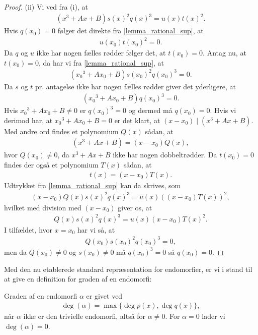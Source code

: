 \begin{proof}
(ii) Vi ved fra (i), at 
\begin{align}
	\label{lemma_rational_sup}
	(x^3 + Ax + B)s(x)^2 q(x)^3 = u(x) t(x)^2.
\end{align}
Hvis $q(x_0) = 0$ følger det direkte fra \eqref{lemma_rational_sup}, at 
\begin{align*}
	u(x_0)t(x_0)^2 = 0.
\end{align*}
Da $q$ og $u$ ikke har nogen fælles rødder følger det, at $t(x_0) = 0$. Antag nu, at $t(x_0)=0$, da har vi fra
\eqref{lemma_rational_sup}, at
\begin{align*}
	({x_0}^3 + Ax_0 + B)s(x_0)^2 q(x_0)^3 = 0.
\end{align*}
Da $s$ og $t$ pr. antagelse ikke har nogen fælles rødder giver det yderligere, at 
\begin{align*}
	({x_0}^3 + Ax_0 + B)q(x_0)^3 = 0.
\end{align*}
Hvis ${x_0}^3 + Ax_0 + B \neq 0$ er $q(x_0)^3 = 0$ og dermed må $q(x_0) = 0$. Hvis vi derimod har, at 
${x_0}^3 + Ax_0 + B = 0$ er det klart, at $(x-x_0) \mid (x^3 + Ax + B)$. Med andre ord findes et polynomium $Q(x)$ sådan, at
\begin{align*}
	(x^3 + Ax + B) = (x-x_0)Q(x),
\end{align*}
hvor $Q(x_0) \neq 0$, da $x^3 + Ax + B$ ikke har nogen dobbeltrødder. Da $t(x_0)=0$ findes der også et polynomium $T(x)$ sådan, at
\begin{align*}
	t(x) = (x-x_0)T(x).
\end{align*}
Udtrykket fra \eqref{lemma_rational_sup} kan da skrives, som
\begin{align*}
	(x-x_0)Q(x)s(x)^2q(x)^3 = u(x) ((x-x_0)T(x))^2,
\end{align*}
hvilket med division med $(x-x_0)$ giver os, at
\begin{align*}
	Q(x)s(x)^2 q(x)^3 =  u(x) (x-x_0) T(x)^2.
\end{align*}
I tilfældet, hvor $x=x_0$ har vi så, at
\begin{align*}
	Q(x_0)s(x_0)^2q(x_0)^3 = 0,
\end{align*}
men da $Q(x_0) \neq 0$ og $s(x_0) \neq 0$ må $q(x_0)^3 = 0$ så $q(x_0)=0$.
\end{proof}


Med den nu etablerede standard repræsentation for endomorfier, er vi i stand til at give en definition for graden af en endomorfi:

\begin{definition}
Graden af en endomorfi $\alpha$ er givet ved
\begin{align*}
	\deg(\alpha) = \max \{ \deg p(x), \deg q(x) \},
\end{align*}
når $\alpha$ ikke er den trivielle endomorfi, altså for $\alpha \neq 0$. For $\alpha = 0$ lader vi $\deg (\alpha) = 0$.
\end{definition}

